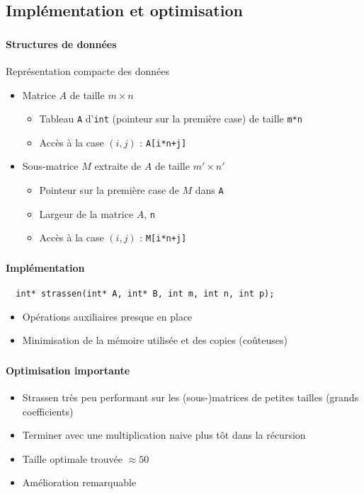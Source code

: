 \documentclass{beamer}
\begin{document}
\subsection{Implémentation et optimisation}
\begin{frame}[fragile]
  \frametitle{\insertsubsection}
  \framesubtitle{Structures de données}
  Représentation compacte des données
  \begin{itemize}
    \item<2-> Matrice $A$ de taille $m\times n$
    \begin{itemize}
      \item Tableau \verb=A= d'\verb=int=
      (pointeur sur la première case) de taille \verb=m*n=
      \item Accès à la case $(i,j)$ : \verb=A[i*n+j]=
    \end{itemize}
    \item<3-> Sous-matrice $M$ extraite de $A$ de taille $m'\times n'$
    \begin{itemize}
      \item Pointeur sur la première case de $M$ dans \verb=A=
      \item Largeur de la matrice $A$, \verb=n=
      \item Accès à la case $(i,j)$ : \verb=M[i*n+j]=
    \end{itemize}
  \end{itemize}
\end{frame}

\begin{frame}[fragile]
  \frametitle{\insertsubsection}
  \framesubtitle{Implémentation}
  \small\begin{verbatim}
  int* strassen(int* A, int* B, int m, int n, int p);
  \end{verbatim}\normalsize

  \begin{itemize}
    \item Opérations auxiliaires presque en place
    \item Minimisation de la mémoire utilisée et des copies (coûteuses)
  \end{itemize}
\end{frame}

\begin{frame}
\end{frame}

\begin{frame}
  \frametitle{\insertsubsection}
  \framesubtitle{Optimisation importante}
  \begin{itemize}
  \item Strassen très peu performant sur les (sous-)matrices de petites
    tailles (grands coefficients)
  \item
    Terminer avec une multiplication naive plus tôt dans la récursion
  \item Taille optimale trouvée $\approx 50$
  \item Amélioration remarquable
  \end{itemize}
\end{frame}
\end{document}
